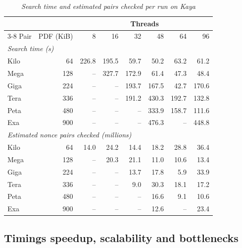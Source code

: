\documentclass[11pt,a4paper]{article}
\begin{document}
\begin{table}[htbp]
  \centering
  \small
  \begin{tabular}{l r *{6}{r}}
    \toprule
         &           & \multicolumn{6}{c}{Threads} \\
    \cmidrule(l){3-8}
    Pair & PDF (KiB) & 8 & 16 & 32 & 48 & 64 & 96 \\
    \midrule
    \multicolumn{8}{l}{\textit{Search time (s)}} \\
    Kilo  &  64 & 226.8 & 195.5 &  59.7 &  50.2 &  63.2 &  61.2 \\
    Mega  & 128 &    -- & 327.7 & 172.9 &  61.4 &  47.3 &  48.4 \\
    Giga  & 224 &    -- &    -- & 193.7 & 167.5 &  42.7 & 170.6 \\
    Tera  & 336 &    -- &    -- & 191.2 & 430.3 & 192.7 & 132.8 \\
    Peta  & 480 &    -- &    -- &    -- & 333.9 & 158.7 & 111.6 \\
    Exa   & 900 &    -- &    -- &    -- & 476.3 &    -- & 448.8 \\
    \midrule
    \multicolumn{8}{l}{\textit{Estimated nonce pairs checked (millions)}} \\
    Kilo  &  64 &  14.0 &  24.2 &  14.4 &  18.2 &  28.8 &  36.4 \\
    Mega  & 128 &    -- &  20.3 &  21.1 &  11.0 &  10.6 &  13.4 \\
    Giga  & 224 &    -- &    -- &  13.7 &  17.8 &   5.9 &  33.9 \\
    Tera  & 336 &    -- &    -- &   9.0 &  30.3 &  18.1 &  17.2 \\
    Peta  & 480 &    -- &    -- &    -- &  16.6 &   9.1 &  10.6 \\
    Exa   & 900 &    -- &    -- &    -- &  12.6 &    -- &  23.4 \\
    \bottomrule
  \end{tabular}
  \caption{\textit{Search time and estimated pairs checked per run on Kaya}}
  \label{tab:perf-runs}
\end{table}



\subsection{Timings speedup, scalability and bottlenecks}
\end{document}
